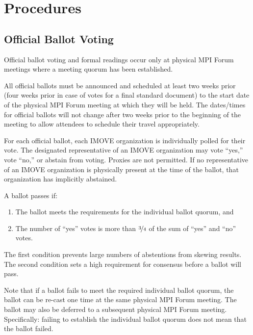 
\section{Procedures}


\subsection{Official Ballot Voting}

Official ballot voting and formal readings occur only at physical MPI
Forum meetings where a meeting quorum has been established.

All official ballots must be announced and scheduled at least two
weeks prior (four weeks prior in case of votes for a final standard
document) to the start date of the physical MPI Forum meeting at
which they will be held.  The dates/times for official ballots will
not change after two weeks prior to the beginning of the meeting to
allow attendees to schedule their travel appropriately.

For each official ballot, each IMOVE organization is individually
polled for their vote.  The designated representative of an IMOVE
organization may vote ``yes,'' vote ``no,'' or abstain from voting.
Proxies are not permitted.  If no representative of an IMOVE
organization is physically present at the time of the ballot, that
organization has implicitly abstained.

A ballot passes if:

\begin{enumerate}
\item The ballot meets the requirements for the individual ballot
  quorum, and
\item The number of ``yes'' votes is more than $\nicefrac{3}{4}$ of
  the sum of ``yes'' and ``no'' votes.
\end{enumerate}

\begin{rationale}
  The first condition prevents large numbers of abstentions from
  skewing results.  The second condition sets a high requirement for
  consensus before a ballot will pass.
\end{rationale}

Note that if a ballot fails to meet the required individual ballot
quorum, the ballot can be re-cast one time at the same physical MPI
Forum meeting.  The ballot may also be deferred to a subsequent
physical MPI Forum meeting.  Specifically: failing to establish the
individual ballot quorum does not mean that the ballot failed.

